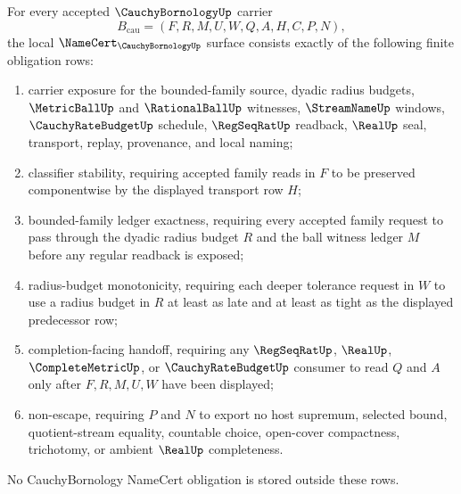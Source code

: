 \begin{theorem}
\label{thm:cauchy-bornology-namecert-obligations}
For every accepted $\CauchyBornologyUp$ carrier
$$
B_{\mathrm{cau}}=(F,R,M,U,W,Q,A,H,C,P,N),
$$
the local $\NameCert_{\CauchyBornologyUp}$ surface consists exactly of the following finite obligation rows:
\begin{enumerate}
\item carrier exposure for the bounded-family source, dyadic radius budgets, $\MetricBallUp$ and $\RationalBallUp$ witnesses, $\StreamNameUp$ windows, $\CauchyRateBudgetUp$ schedule, $\RegSeqRatUp$ readback, $\RealUp$ seal, transport, replay, provenance, and local naming;
\item classifier stability, requiring accepted family reads in $F$ to be preserved componentwise by the displayed transport row $H$;
\item bounded-family ledger exactness, requiring every accepted family request to pass through the dyadic radius budget $R$ and the ball witness ledger $M$ before any regular readback is exposed;
\item radius-budget monotonicity, requiring each deeper tolerance request in $W$ to use a radius budget in $R$ at least as late and at least as tight as the displayed predecessor row;
\item completion-facing handoff, requiring any $\RegSeqRatUp$, $\RealUp$, $\CompleteMetricUp$, or $\CauchyRateBudgetUp$ consumer to read $Q$ and $A$ only after $F,R,M,U,W$ have been displayed;
\item non-escape, requiring $P$ and $N$ to export no host supremum, selected bound, quotient-stream equality, countable choice, open-cover compactness, trichotomy, or ambient $\RealUp$ completeness.
\end{enumerate}
No CauchyBornology NameCert obligation is stored outside these rows.
\end{theorem}
